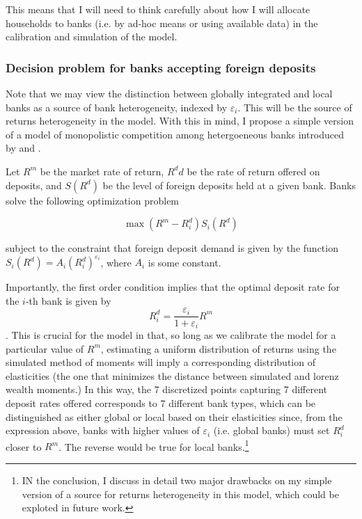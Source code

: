 \par This means that I will need to think carefully about how I will allocate households to banks (i.e. by ad-hoc means or using available data) in the calibration and simulation of the model.

\subsubsection{Decision problem for banks accepting foreign deposits}

\par Note that we may view the distinction between globally integrated and local banks as a source of bank heterogeneity, indexed by $\varepsilon_i$. This will be the source of returns heterogeneity in the model. With this in mind, I propose a simple version of a model of monopolistic competition among hetergoeneous banks introduced by \cite{Monti1972} and \cite{Klein1971}.

\par Let $R^m$ be the market rate of return, $R^dd$ be the rate of return offered on deposits, and $S(R^d)$ be the level of foreign deposits held at a given bank. Banks solve the following optimization problem

$$ \max (R^m -R_i^d) S_i(R^d) $$

\par subject to the constraint that foreign deposit demand is given by the function $S_i(R^d) = A_i (R_i^d)^{\varepsilon_i}$, where $A_i$ is some constant. 

\par Importantly, the first order condition implies that the optimal deposit rate for the $i$-th bank is given by $$ R_i^d = \frac{\varepsilon_i}{1+\varepsilon_i} R^m  $$. This is crucial for the model in that, so long as we calibrate the model for a particular value of $R^m$, estimating a uniform distribution of returns using the simulated method of moments will imply a corresponding distribution of elasticities (the one that minimizes the distance between simulated and lorenz wealth moments.) In this way, the 7 discretized points capturing 7 different deposit rates offered corresponds to 7 different bank types, which can be distinguished as either global or local based on their elasticities since, from the expression above, banks with higher values of $\varepsilon_i$ (i.e. global banks)  must set $R_i^d$ closer to $R^m$. The reverse would be true for local banks.\footnote{IN the conclusion, I discuss in detail two major drawbacks on my simple version of a source for returns heterogeneity in this model, which could be exploted in future work.}

